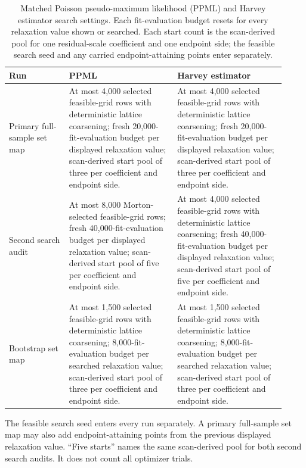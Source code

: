\documentclass[11pt]{article}
\begin{document}
\begin{table}[htbp]
  \centering
  \caption{Matched Poisson pseudo-maximum likelihood (PPML) and Harvey estimator search
  settings. Each fit-evaluation budget resets for every relaxation value shown
  or searched. Each start count is the scan-derived pool for one residual-scale
  coefficient and one endpoint side; the feasible search seed and any carried
  endpoint-attaining points enter separately.}
  \label{tab:ppml-harvey-search}
  \small
  \begin{tabular}{@{}>{\raggedright\arraybackslash}p{0.20\linewidth}
                      >{\raggedright\arraybackslash}p{0.36\linewidth}
                      >{\raggedright\arraybackslash}p{0.36\linewidth}@{}}
    \toprule
    Run & PPML & Harvey estimator \\
    \midrule
    Primary full-sample set map &
    At most 4,000 selected feasible-grid rows with deterministic lattice
    coarsening; fresh 20,000-fit-evaluation budget per displayed relaxation value;
    scan-derived start pool of three per coefficient and endpoint side. &
    At most 4,000 selected feasible-grid rows with deterministic lattice
    coarsening; fresh 20,000-fit-evaluation budget per displayed relaxation value;
    scan-derived start pool of three per coefficient and endpoint side. \\
    Second search audit &
    At most 8,000 Morton-selected feasible-grid rows; fresh
    40,000-fit-evaluation budget per displayed relaxation value; scan-derived start pool
    of five per coefficient and endpoint side. &
    At most 4,000 selected feasible-grid rows with deterministic lattice
    coarsening; fresh 40,000-fit-evaluation budget per displayed relaxation value;
    scan-derived start pool of five per coefficient and endpoint side. \\
    Bootstrap set map &
    At most 1,500 selected feasible-grid rows with deterministic lattice
    coarsening; 8,000-fit-evaluation budget per searched relaxation value; scan-derived
    start pool of three per coefficient and endpoint side. &
    At most 1,500 selected feasible-grid rows with deterministic lattice
    coarsening; 8,000-fit-evaluation budget per searched relaxation value; scan-derived
    start pool of three per coefficient and endpoint side. \\
    \bottomrule
  \end{tabular}
\end{table}

The feasible search seed enters every run separately. A primary full-sample set
map may also add endpoint-attaining points from the previous displayed
relaxation value. ``Five starts'' names the same scan-derived pool for
both second search audits. It does not count all optimizer trials.
\end{document}
